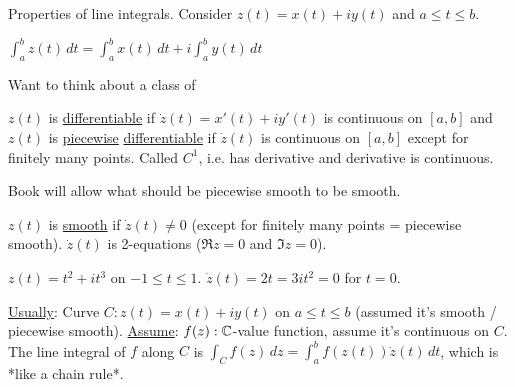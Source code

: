 \documentclass[]{article}
\begin{document}
Properties of line integrals.
Consider $z(t) = x(t) + iy(t)$ and $a\leq t\leq b$.
\begin{definition}
	$\int_a^b z(t) \, dt = \int_a^b x(t) \, dt + i\int_a^b y(t) \, dt$
\end{definition}
Want to think about a class of 
\begin{definition}
	$z(t)$ is \underline{differentiable} if $\dot{z}(t) = x'(t) + iy'(t)$ is continuous on $[a,b]$ and $z(t)$ is \underline{piecewise} \underline{differentiable} if $\dot{z}(t)$ is continuous on $[a,b]$ except for finitely many points. Called $C^1$, i.e. has derivative and derivative is continuous.
\end{definition}
\begin{note}
	Book will allow what should be piecewise smooth to be smooth.
\end{note}
\begin{definition}
	$z(t)$ is \underline{smooth} if $\dot{z}(t) \neq 0$ (except for finitely many points = piecewise smooth). $\dot{z}(t)$ is 2-equations ($\Re z=0$ and $\Im z = 0$).
\end{definition}
\begin{example}
	$z(t) = t^2 + it^3$ on $-1\leq t \leq 1$. $\dot{z}(t) = 2t = 3it^2 = 0$ for $t=0$.
\end{example}
\underline{Usually}: Curve $C: z(t) = x(t) + iy(t)$ on $a\leq t \leq b$ (assumed it's smooth / piecewise smooth).
\underline{Assume}: $f(z): \mathbb{C}$-value function, assume it's continuous on $C$.
The line integral of $f$ along $C$ is $\int_C f(z) \, dz = \int_a^b f(z(t))\dot{z}(t) \, dt$, which is *like a chain rule*.
\end{document}
